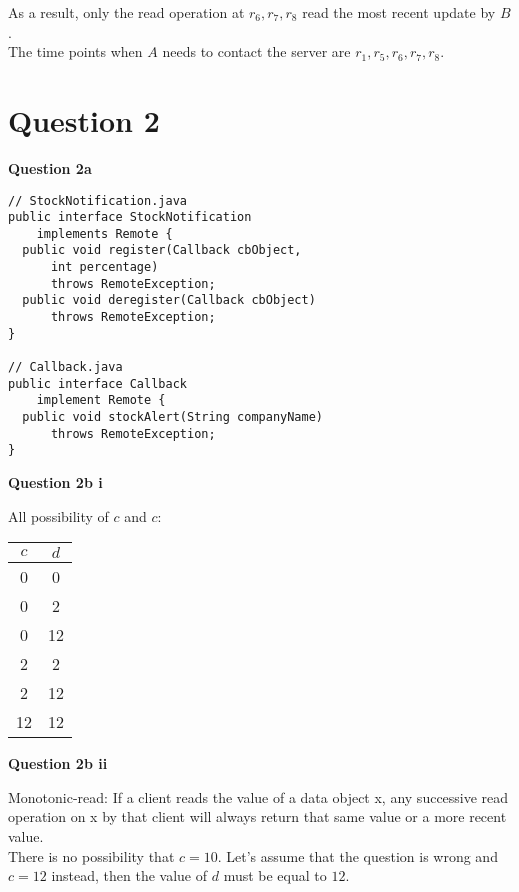 \documentclass[11pt,a4paper]{report}
\begin{document}
\begin{multicols*}{2}
\noindent As a result, only the read operation at $r_6,r_7,r_8$ read the most recent update by $B$. \\

\noindent The time points when $A$ needs to contact the server are $r_1,r_5,r_6,r_7,r_8$.\\

\section{Question 2}

\noindent \textbf{Question 2a}

\begin{verbatim}
// StockNotification.java
public interface StockNotification 
    implements Remote {
  public void register(Callback cbObject, 
      int percentage) 
      throws RemoteException;
  public void deregister(Callback cbObject) 
      throws RemoteException;
}

// Callback.java
public interface Callback 
    implement Remote {
  public void stockAlert(String companyName) 
      throws RemoteException;
}
\end{verbatim}

\noindent \textbf{Question 2b i}

\noindent All possibility of $c$ and $c$:

\begin{center}
\begin{tabular}{|c|c|}
  \hline
  $c$ & $d$ \\
  \hline
  0  & 0  \\
  0  & 2  \\
  0  & 12 \\
  2  & 2  \\
  2  & 12 \\
  12 & 12 \\ \hline
\end{tabular}
\end{center}

\noindent \textbf{Question 2b ii}

\noindent Monotonic-read: If a client reads the value of a data object x, any successive read operation on x by that client will always return that same value or a more recent value.\\

\noindent There is no possibility that $c=10$. Let's assume that the question is wrong and $c=12$ instead, then the value of $d$ must be equal to $12$.\\


\end{multicols*}
\end{document}
